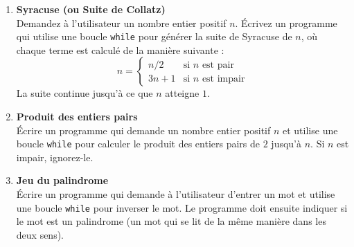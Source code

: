 \begin{enumerate}
    \item \textbf{Syracuse (ou Suite de Collatz)} \\
    Demandez à l'utilisateur un nombre entier positif $n$. Écrivez un programme qui utilise une boucle \texttt{while} pour générer la suite de Syracuse de $n$, où chaque terme est calculé de la manière suivante :
    \[
    n = 
    \begin{cases} 
      n / 2 & \text{si } n \text{ est pair} \\
      3n + 1 & \text{si } n \text{ est impair}
    \end{cases}
    \]
    La suite continue jusqu'à ce que $n$ atteigne $1$.
    
    \item \textbf{Produit des entiers pairs} \\
    Écrire un programme qui demande un nombre entier positif $n$ et utilise une boucle \texttt{while} pour calculer le produit des entiers pairs de $2$ jusqu'à $n$. Si $n$ est impair, ignorez-le.
    
    \item \textbf{Jeu du palindrome} \\
    Écrire un programme qui demande à l'utilisateur d'entrer un mot et utilise une boucle \texttt{while} pour inverser le mot. Le programme doit ensuite indiquer si le mot est un palindrome (un mot qui se lit de la même manière dans les deux sens).
    
\end{enumerate}